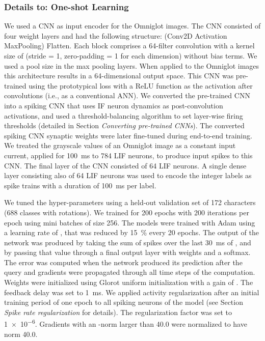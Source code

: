 \documentclass{article}
\begin{document}
\subsubsection*{Details to: One-shot Learning}
We used a \gls{CNN} as input encoder for the Omniglot images.
The \gls{CNN} consisted of four weight layers and had the following structure:   (Conv2D  Activation  MaxPooling)  Flatten. Each block comprises a \num{64}-filter convolution with a kernel size of  (stride = \num{1}, zero-padding = \num{1} for each dimension) without bias terms. We used a  pool size in the max pooling layers. 
When applied to the  Omniglot images this architecture results in a \num{64}-dimensional output space. 
This \gls{CNN} was pre-trained using the prototypical loss \cite{snell2017prototypical} with a ReLU function as the activation after convolutions (i.e., as a conventional \gls{ANN}).
We converted the pre-trained \gls{CNN} into a spiking \gls{CNN} that uses \gls{IF} neuron dynamics as post-convolution activations, and used a threshold-balancing algorithm to set layer-wise firing thresholds \cite{diehl2015fast,sengupta2019going} (detailed in Section \emph{Converting pre-trained CNNs}).
The converted spiking \gls{CNN} synaptic weights were later fine-tuned during end-to-end training.
We treated the grayscale values of an Omniglot image as a constant input current, applied for \SI{100}{\ms} to \num{784} \gls{LIF} neurons, to produce input spikes to this \gls{CNN}.
The final layer of the \gls{CNN} consisted of \num{64} \gls{LIF} neurons. 
A single dense layer consisting also of \num{64} \gls{LIF} neurons was used to encode the integer labels as spike trains with a duration of \SI{100}{\ms} per label.

We tuned the hyper-parameters using a held-out validation set of \num{172} characters (\num{688} classes with rotations). We trained for \num{200} epochs with \num{200} iterations per epoch using mini batches of size \num{256}. The models were trained with Adam \cite{kingma2014adam} using a learning rate of , that was reduced by \SI{15}{\percent} every \num{20} epochs. The output of the network was produced by taking the sum of spikes over the last \SI{30}{ms} of , and by passing that value through a final output layer with weights  and a softmax. The error was computed when the network produced its prediction after the query and gradients were propagated through all time steps of the computation. Weights were initialized using Glorot uniform initialization \cite{glorot2010understanding} with a gain of . The feedback delay  was set to \SI{1}{ms}. We applied  activity regularization after an initial training period of one epoch to all spiking neurons of the model (see Section \emph{Spike rate regularization} for details). The regularization factor  was set to \num{1e-6}. Gradients with an -norm larger than \num{40.0} were normalized to have norm \num{40.0}.
\end{document}

